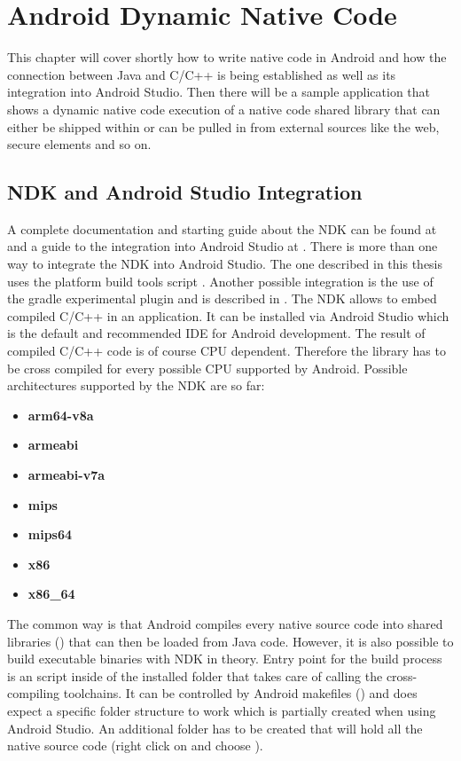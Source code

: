 \chapter{Android Dynamic Native Code}\label{chapter:android_dynamic_native_code}

This chapter will cover shortly how to write native code in Android and how
the connection between Java and C/C++ is being established as well as its
integration into Android Studio.
Then there will be a sample application that shows a dynamic native code execution of a native code shared library that can either be shipped within  or can be pulled in from external sources like the web, secure elements and so on.

\section{NDK and Android Studio Integration}\label{section:ndk_integration}
A complete documentation and starting guide about the NDK can be found at \parencite{ndk} and a guide to the integration into Android Studio at \parencite{ndk_integration}.
There is more than one way to integrate the NDK into Android Studio. The one described
in this thesis uses the platform build tools script . Another possible
integration is the use of the gradle experimental plugin and is described in \parencite{gradle_experimental}.
The NDK allows to embed compiled C/C++ in an application. It can be installed via Android Studio which is the default and recommended IDE for Android development.
The result of compiled C/C++ code is of course CPU dependent. Therefore the library has to be cross compiled for 
every possible CPU supported by Android. Possible architectures supported by the NDK are so far:
\begin{itemize}
\item \textbf{arm64-v8a}
\item \textbf{armeabi}
\item \textbf{armeabi-v7a}
\item \textbf{mips}
\item \textbf{mips64}
\item \textbf{x86}
\item \textbf{x86\_64}
\end{itemize}
The common way is that Android compiles every native source code into shared libraries
() that can then be loaded from Java code. However, it is also possible to build executable binaries with NDK in theory. Entry point for the build process is an  script inside of the installed  folder that takes care of calling the cross-compiling toolchains. It can be controlled by Android makefiles () and does 
expect a specific folder structure to work which is partially created when using Android Studio. An additional  folder has to be created that will hold all the native source code (right click on  and choose ). 


